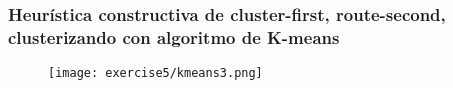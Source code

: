 \subsubsection{Heurística constructiva de cluster-first, route-second, clusterizando con algoritmo de K-means}


\begin{figure}[H]
	\centering
	\texttt{[image: exercise5/kmeans3.png]}
\end{figure}